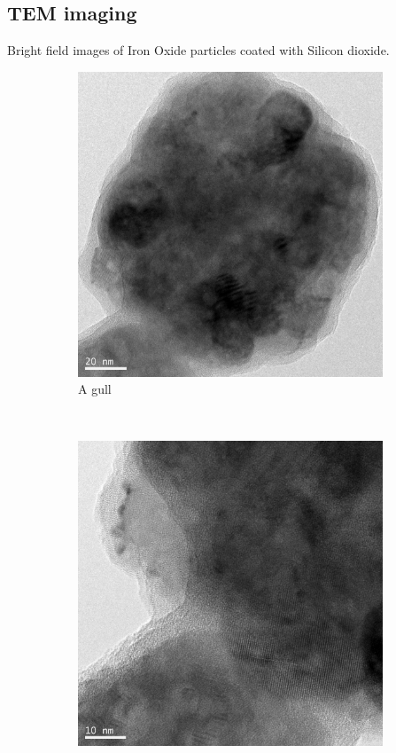 \documentclass[12pt,a4paper]{article}
\begin{document}
\subsection{TEM imaging} %
\label{sub:tem_imaging}

Bright field images of Iron Oxide particles coated with Silicon dioxide.



\begin{figure}
  \centering
  
  \begin{subfigure}[b]{0.45\textwidth}
    \includegraphics[width=\textwidth]{Data/Fe3O4-SiO2-0001.png}
    \caption{A gull}
    \label{fig:gull}
  \end{subfigure}%
  ~
  \begin{subfigure}[b]{0.45\textwidth}
    \includegraphics[width=\textwidth]{Data/Fe3O4-SiO2-0002.png}

\end{subfigure}
\end{figure}
\end{document}
